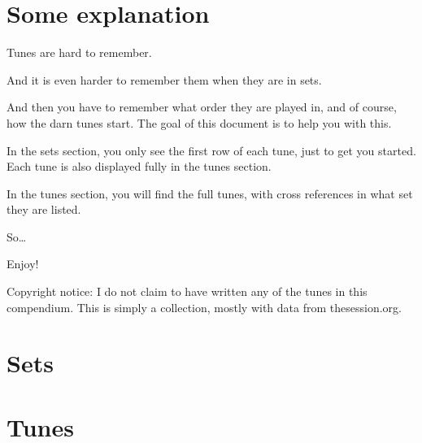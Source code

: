 \documentclass[10pt]{book}
\begin{document}

\setcounter{tocdepth}{3}
\tableofcontents
{}
\clearpage

\setcounter{page}{1}
\chapter*{Some explanation}
Tunes are hard to remember.

And it is even harder to remember them when they are in sets.

And then you have to remember what order they are played in, and of course, how the darn tunes start. The goal of this document is to help you with this.

In the sets section, you only see the first row of each tune, just to get you started. Each tune is also displayed fully in the tunes section.

In the tunes section, you will find the full tunes, with cross references in what set they are listed.

So\ldots

Enjoy!

Copyright notice: I do not claim to have written any of the tunes in this compendium. This is simply a collection, mostly with data from thesession.org. 

\chapter{Sets}

\clearpage

\clearpage

\clearpage

\clearpage

\clearpage
\chapter{Tunes}

\clearpage

\clearpage

\clearpage

\clearpage

\printindex
\end{document}

